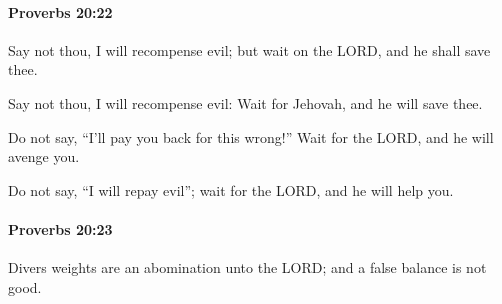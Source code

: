 		\paragraph{Proverbs 20:22} %
			\label{PROVERBS-20-22}

			Say not thou, I will recompense evil; but wait on the LORD, and he shall save thee.

			\begin{versebox}
					\item[BHS] 
					\item[ASV] Say not thou, I will recompense evil: Wait for Jehovah, and he will save thee.
					\item[NIV] Do not say, “I’ll pay you back for this wrong!” Wait for the LORD, and he will avenge you.
					\item[NRSV] Do not say, “I will repay evil”; wait for the LORD, and he will help you.
			\end{versebox}

		\paragraph{Proverbs 20:23} %
			\label{PROVERBS-20-23}

			Divers weights are an abomination unto the LORD; and a false balance is not good.

